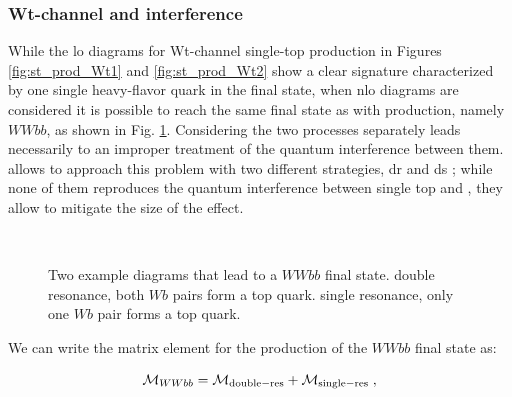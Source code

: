 \subsubsection*{Wt-channel and \ttbar interference}

While the \gls{lo} diagrams for Wt-channel single-top production in Figures \ref{fig:st_prod_Wt1} and \ref{fig:st_prod_Wt2} show a clear signature characterized by one single heavy-flavor quark in the final state,
when \gls{nlo} diagrams are considered it is possible to reach the same final state as with \ttbar production, namely $WWbb$, as shown in Fig. \ref{fig:WWbb_int}. 
Considering the two processes separately leads necessarily to an improper treatment of the quantum interference between them.
\PowhegBox allows to approach this problem with two different strategies, \gls{dr} and \gls{ds} \cite{Frixione:2005vw}; while none of them reproduces the quantum interference between single top and \ttbar, they allow to mitigate the size of the effect. 

\begin{figure}[h]
\centering 
{}$\;\;\;\;\;\;$
\caption{Two example diagrams that lead to a $WWbb$ final state.  double resonance, both $Wb$ pairs form a top quark.  single resonance, only one $Wb$ pair forms a top quark.}\label{fig:WWbb_int}
\end{figure}


We can write the matrix element for the production of the $WWbb$ final state as:

\begin{equation}
\mathcal{M}_{WWbb} = \mathcal{M}_{\rm{double-res}} + \mathcal{M}_{\rm{single-res}} \; ,
\end{equation}

